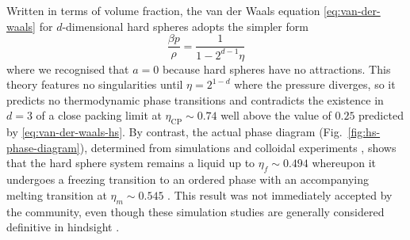 \documentclass[11pt,twoside]{report}
\begin{document}
Written in terms of volume fraction, the van der Waals equation \eqref{eq:van-der-waals} for $d$-dimensional hard spheres adopts the simpler form%
\begin{equation}\label{eq:van-der-waals-hs}
  \frac{\beta p}{\rho} = \frac{1}{1 - 2^{d-1} \eta}
\end{equation}
where we recognised that $a = 0$ because hard spheres have no attractions.
This theory features no singularities until $\eta = 2^{1-d}$ where the pressure diverges, so it predicts no thermodynamic phase transitions and contradicts the existence in $d=3$ of a close packing limit at $\eta_\mathrm{CP} \sim 0.74$ well above the value of $0.25$ predicted by \eqref{eq:van-der-waals-hs}.
By contrast, the actual phase diagram (Fig.\ \ref{fig:hs-phase-diagram}), determined from simulations \cite{AlderJCP1957,WoodJCP1957,HooverJCP1968} and colloidal experiments \cite{PuseyN1986}, shows that the hard sphere system remains a liquid%
up to $\eta_f \sim 0.494$ whereupon it undergoes a freezing transition to an ordered phase with an accompanying melting transition at $\eta_m \sim 0.545$ \cite{HooverJCP1968}.
This result was not immediately accepted by the community, even though these simulation studies are generally considered definitive in hindsight \cite{MareschalEPJH2018}.
\end{document}
